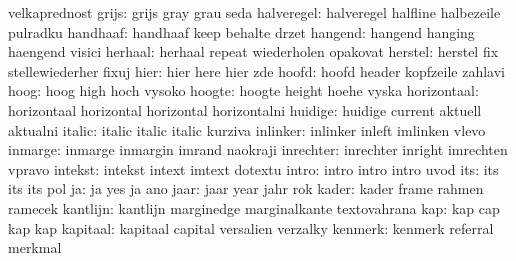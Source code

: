                       velkaprednost
              grijs:  grijs                gray                grau
                      seda
         halveregel:  halveregel           halfline            halbezeile
                      pulradku
           handhaaf:  handhaaf             keep                behalte
                      drzet
            hangend:  hangend              hanging             haengend
                      visici
            herhaal:  herhaal              repeat              wiederholen
                      opakovat
            herstel:  herstel              fix                 stellewiederher
                      fixuj
               hier:  hier                 here                hier
                      zde
              hoofd:  hoofd                header              kopfzeile
                      zahlavi
               hoog:  hoog                 high                hoch
                      vysoko
             hoogte:  hoogte               height              hoehe
                      vyska
        horizontaal:  horizontaal          horizontal          horizontal
                      horizontalni
            huidige:  huidige              current             aktuell
                      aktualni
             italic:  italic               italic              italic
                      kurziva
           inlinker:  inlinker             inleft              imlinken
                      vlevo
            inmarge:  inmarge              inmargin            imrand
                      naokraji
          inrechter:  inrechter            inright             imrechten
                      vpravo
            intekst:  intekst              intext              imtext
                      dotextu
              intro:  intro                intro               intro
                      uvod
                its:  its                  its                 its
                      pol
                 ja:  ja                   yes                 ja
                      ano
               jaar:  jaar                 year                jahr
                      rok
              kader:  kader                frame               rahmen
                      ramecek
           kantlijn:  kantlijn             marginedge          marginalkante
                      textovahrana
                kap:  kap                  cap                 kap
                      kap
           kapitaal:  kapitaal             capital             versalien
                      verzalky
            kenmerk:  kenmerk              referral            merkmal
